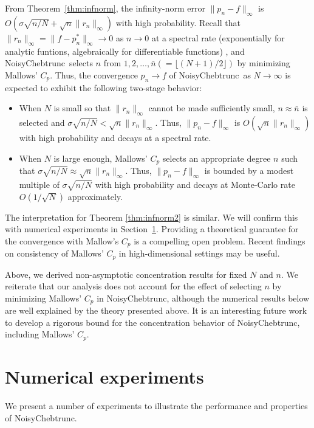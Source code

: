 \documentclass[final,onefignum,onetabnum]{siamart220329}
\def\mainalg{NoisyChebtrunc}
\begin{document}
From Theorem~\ref{thm:infnorm}, the infinity-norm error $\|p_n-f\|_\infty$ is $O(\sigma \sqrt{n/N} + \sqrt{n} \| r_n \|_{\infty})$ with high probability.
Recall that $\| r_n \|_{\infty} =\|f-p_n^*\|_\infty \to 0$ as $n \to 0$ at a spectral rate (exponentially for analytic funtions, algebraically for differentiable functions) \cite[Ch.~7,8]{trefethenatap}, and \mainalg\ selects $n$ from $1,2,\dots,\bar{n}(=\lfloor (N+1)/2\rfloor)$ by minimizing Mallows' $C_p$.
Thus, the convergence $p_n\rightarrow f$ of \mainalg\ as $N\rightarrow\infty$ is expected to exhibit the following two-stage behavior:
\begin{itemize}
	\item When $N$ is small so that $\| r_n \|_{\infty}$ cannot be made sufficiently small, $n \approx \bar{n}$ is selected and $\sigma \sqrt{n/N} < \sqrt{n} \| r_n \|_{\infty}$. Thus, $\|p_n-f\|_\infty$ is $O(\sqrt{n} \|r_n\|_\infty)$ with high probability and decays at a spectral rate. 
	
	\item When $N$ is large enough, Mallows' $C_p$ selects an appropriate degree $n$ such that $\sigma \sqrt{n/N} \approx \sqrt{n} \| r_n \|_{\infty}$. Thus, $\|p_n-f\|_\infty$ is bounded by a modest multiple of $\sigma \sqrt{n/N}$ with high probability and decays at Monte-Carlo rate $O(1/\sqrt{N})$ approximately.
\end{itemize}
The interpretation for Theorem \ref{thm:infnorm2} is similar.
We will confirm this with numerical experiments in Section~\ref{sec:exp}. 
Providing a theoretical guarantee for the convergence with Mallow's $C_p$ 
is a compelling open problem. Recent findings on consistency of Mallows' $C_p$ in high-dimensional settings \cite{fujikoshi2014consistency,yanagihara2015consistency} may be useful.

Above, we derived non-asymptotic concentration results for fixed $N$ and $n$.
We reiterate that our analysis does not  account for the effect of selecting $n$ by minimizing Mallows' $C_p$ in \mainalg, although the numerical results below are well explained by the theory presented above. 
It is an interesting future work to develop a rigorous bound for the concentration behavior of \mainalg, including Mallows' $C_p$.


\section{Numerical experiments}\label{sec:exp}
We present a number of experiments to illustrate the performance and properties of \mainalg. 
\end{document}
